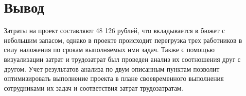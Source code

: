 \section{Вывод}

Затраты на проект составляют 48 126 рублей, что вкладывается в бюжет с небольшим
запасом, однако в проекте происходит перегрузка трех работников в силу наложения
по срокам выполняемых ими задач. Также с помощью визуализации затрат и
трудозатрат был проведен анализ их соотношения друг с другом. Учет результатов
анализа по двум описанным пунктам позволит оптимизировать выполнение проекта в
плане своевременного выполнения сотрудниками их задач и соответствия затрат
трудозатратам.

